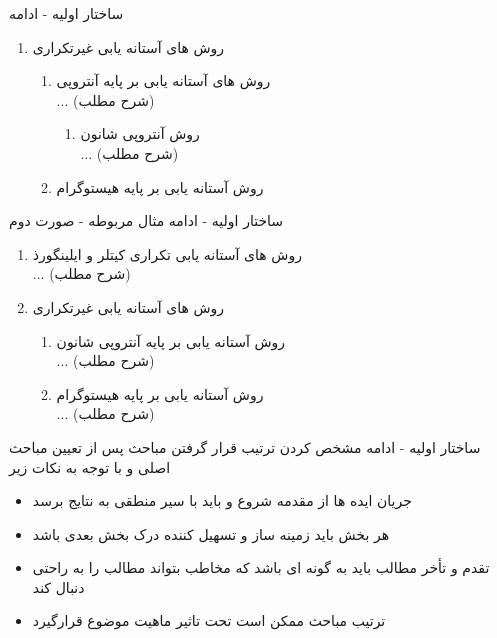 \documentclass[14pt]{beamer}
\makeatletter
\newcommand{\rtlist}{\raggedleft\rightskip\@totalleftmargin}
\newcommand{\frametitlefontsize}{\fontsize{20pt}{0pt}\selectfont}
\makeatother
\begin{document}
\begin{persian}
\begin{frame}{\frametitlefontsize ساختار اولیه - ادامه}
\begin{enumerate}
			\item روش های آستانه یابی غیرتکراری
			\begin{enumerate}\rtlist
				\item روش های آستانه یابی بر پایه آنتروپی
				\\ ... (شرح مطلب)
				\begin{enumerate}\rtlist
					\item روش آنتروپی شانون
					\\ ... (شرح مطلب)
				\end{enumerate}
				
				\item روش آستانه یابی بر پایه هیستوگرام
			\end{enumerate}
		\end{enumerate}
	\end{frame}
	
	\begin{frame}{\frametitlefontsize ساختار اولیه - ادامه}
		مثال مربوطه - صورت دوم
		\begin{enumerate}\rtlist
			\item روش های آستانه یابی تکراری کیتلر و ایلینگورذ
			\\ ... (شرح مطلب)
			
			\item روش های آستانه یابی غیرتکراری
			\begin{enumerate}\rtlist
				\item روش آستانه یابی بر پایه آنتروپی شانون
				\\ ... (شرح مطلب)
				
				\item روش آستانه یابی بر پایه هیستوگرام
				\\ ... (شرح مطلب)				
			\end{enumerate}
		\end{enumerate}
	\end{frame}
	
	\begin{frame}{\frametitlefontsize ساختار اولیه - ادامه}
		مشخص کردن ترتیب قرار گرفتن مباحث پس از تعیین مباحث اصلی و با توجه به نکات زیر
		
		\begin{itemize}\rtlist
			\item جریان ایده ها از مقدمه شروع و باید با سیر منطقی به نتایج برسد
			\item هر بخش باید زمینه ساز و تسهیل کننده درک بخش بعدی باشد 
			\item تقدم و تأخر مطالب باید به گونه ای باشد که مخاطب بتواند مطالب را به راحتی دنبال کند 
			\item ترتیب مباحث ممکن است تحت تاثیر ماهیت موضوع قرارگیرد
		\end{itemize}
	\end{frame}
	

\end{persian}
\end{document}
